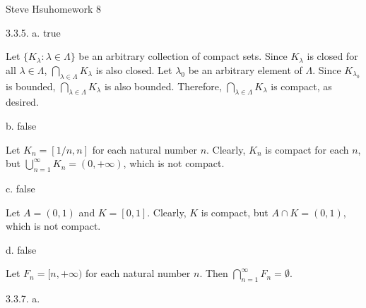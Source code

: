 \def\abs#1{\vert#1\vert}
\centerline{Steve Hsu\hfill homework 8}
\item{3.3.5.} a. true

Let $\{K _\lambda : \lambda \in \Lambda\}$
be an arbitrary collection of compact sets.
Since $K _\lambda$ is closed for all $\lambda \in \Lambda$,
$\bigcap _{\lambda \in \Lambda} K _\lambda$ is also closed.
Let $\lambda _0$ be an arbitrary element of $\Lambda$.
Since $K _{\lambda _0}$ is bounded,
$\bigcap _{\lambda \in \Lambda} K _\lambda$ is also bounded.
Therefore, $\bigcap _{\lambda \in \Lambda} K _\lambda$
is compact, as desired.
\medskip
\item{} b. false

Let $K_n = [1/n, n]$ for each natural number $n$.
Clearly, $K_n$ is compact for each $n$,
but $\bigcup _{n = 1} ^\infty K_n = (0, +\infty)$,
which is not compact.
\medskip
\item{} c. false

Let $A = (0,1)$ and $K = [0,1]$.
Clearly, $K$ is compact, but $A \cap K = (0,1)$,
which is not compact.
\medskip
\item{} d. false

Let $F_n = [n, +\infty)$ for each natural number $n$.
Then $\bigcap _{n = 1} ^\infty F_n = \emptyset$.
\bigskip
\item{3.3.7.} a.

